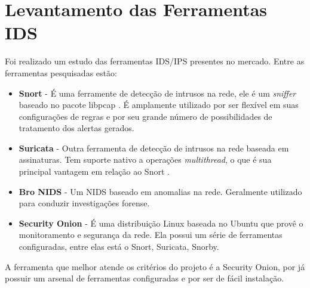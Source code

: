 	\section{Levantamento das Ferramentas IDS}
	\label{sec:IDS_Ferramentas}
	

		Foi realizado um estudo das ferramentas IDS/IPS presentes no mercado. Entre as ferramentas pesquisadas estão:

			\begin{itemize}
				\item \textbf{Snort} - É uma ferramente de detecção de intrusos na rede, ele é um \textit{sniffer} baseado no pacote libpcap \cite{Martin}. É amplamente utilizado por ser flexível em suas configurações de regras e por seu grande número de possibilidades de tratamento dos alertas gerados. 
				\item \textbf{Suricata} - Outra ferramenta de detecção de intrusos na rede baseada em assinaturas. Tem suporte nativo a operações \textit{multithread}, o que é sua principal vantagem em relação ao Snort \cite{Albin}. 
				\item \textbf{Bro NIDS} - Um NIDS baseado em anomalias na rede. Geralmente utilizado para conduzir investigações forense.
				\item \textbf{Security Onion} - É uma distribuição Linux baseada no Ubuntu que provê o monitoramento e segurança da rede. Ela possui um série de ferramentas configuradas, entre elas está o Snort, Suricata, Snorby.  
			\end{itemize}

		A ferramenta que melhor atende os critérios do projeto é a Security Onion, por já possuir um arsenal de ferramentas configuradas e por ser de fácil instalação.
